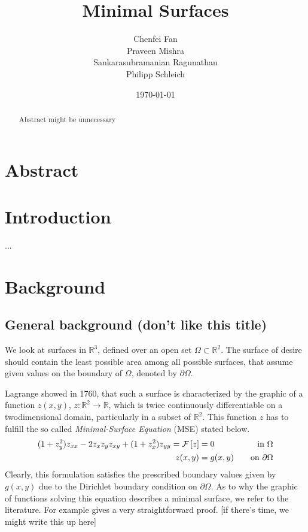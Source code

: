 \documentclass[11pt]{scrartcl}
\title{Minimal Surfaces}
\author{Chenfei Fan \\  Praveen Mishra \\ Sankarasubramanian Ragunathan\\ Philipp Schleich}
\date{\today \\ \vspace{0.9cm}}
\newcommand{\mSurf}[1]{\ensuremath{\mathcal{F}\left[#1\right]}}
\begin{document}
\maketitle

\section*{Abstract}
\begin{abstract}
\noindent Abstract might be unnecessary
\end{abstract}

\clearpage
\protect \tableofcontents



\newpage
	
\onehalfspacing
\section{Introduction}
...
\section{Background}
\subsection{General background (don't like this title)}
We look at surfaces in $ \mathbb{R}^3 $, defined over an open set $\Omega \subset \mathbb{R}^2$. 
The surface of desire should contain the least possible area among all possible surfaces, that assume given values on the boundary of $\Omega$, denoted by $\partial \Omega$. \cite{Sakai1976}

Lagrange showed in 1760, that such a surface is characterized by the graphic of a function $z(x,y)$, $z: \mathbb{R}^2 \to \mathbb{R} $, which is twice continuously differentiable on a twodimensional domain, particularly in a subset of $\mathbb{R}^2$.
This function $z$ has to fulfill the so called \textit{Minimal-Surface Equation} (MSE) stated below.
\begin{align}\label{eq:MSE}
	(1+z_y^2) z_{xx} - 2 z_x z_y z_{xy} + (1+z_x^2)z_{yy} = \mSurf{z} &= 0 \quad &\text{in } \Omega \\
	z(x,y) &= g(x,y) \quad &\text{on } \partial \Omega \notag
\end{align}
Clearly, this formulation satisfies the prescribed boundary values given by $g(x,y)$ due to the Dirichlet boundary condition on $\partial\Omega$.
As to why the graphic of functions solving this equation describes a minimal surface, we refer to the literature. For example \cite{Sakai1976} gives a very straightforward proof. [if there's time, we might write this up here]
\end{document}
